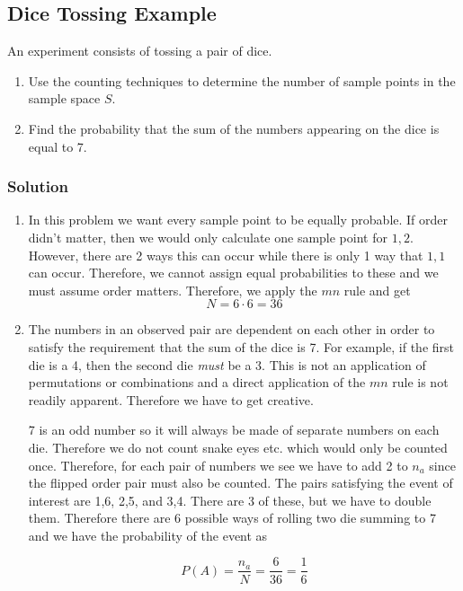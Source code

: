 \documentclass[11pt]{article}
\theoremstyle{definition}
\begin{document}
\subsection{Dice Tossing Example}

An experiment consists of tossing a pair of dice.

\begin{enumerate}
	\item Use the counting techniques to determine the number of sample points in the sample space $S$.
	\item Find the probability that the sum of the numbers appearing on the dice is equal to 7.
\end{enumerate}

\subsubsection*{Solution}

\begin{enumerate}
	\item In this problem we want every sample point to be equally probable. If order didn't matter, then we would only calculate one sample point for ${1, 2}$. However, there are 2 ways this can occur while there is only 1 way that ${1, 1}$ can occur. Therefore, we cannot assign equal probabilities to these and we must assume order matters. Therefore, we apply the $mn$ rule and get
	$$
		N = 6 \cdot 6 = 36	
	$$
	\item The numbers in an observed pair are dependent on each other in order to satisfy the requirement that the sum of the dice is 7. For example, if the first die is a 4, then the second die \textit{must} be a 3. This is not an application of permutations or combinations and a direct application of the $mn$ rule is not readily apparent. Therefore we have to get creative.
	
	7 is an odd number so it will always be made of separate numbers on each die. Therefore we do not count snake eyes etc. which would only be counted once. Therefore, for each pair of numbers we see we have to add 2 to $n_a$ since the flipped order pair must also be counted. The pairs satisfying the event of interest are {1,6}, {2,5}, and {3,4}. There are 3 of these, but we have to double them. Therefore there are 6 possible ways of rolling two die summing to 7 and we have the probability of the event as
	
	$$
		P(A) = \frac{n_a}{N} = \frac{6}{36} = \frac{1}{6}
	$$
\end{enumerate}
\end{document}
